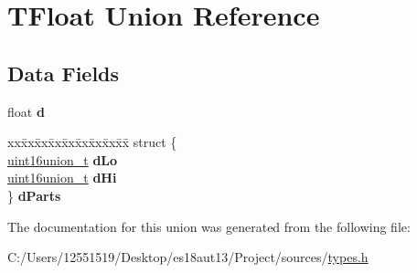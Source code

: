 \hypertarget{union_t_float}{}\section{T\+Float Union Reference}
\label{union_t_float}
\subsection*{Data Fields}
\begin{DoxyCompactItemize}
\item 
\hypertarget{union_t_float_a5261069e995f7e1b2b3b7580c954996b}{}float {\bfseries d}\label{union_t_float_a5261069e995f7e1b2b3b7580c954996b}

\item 
\hypertarget{union_t_float_ae1eaef4719ce541fef065e6ccded1a4b}{}\begin{tabbing}
xx\=xx\=xx\=xx\=xx\=xx\=xx\=xx\=xx\=\kill
struct \{\\
\>\hyperlink{unionuint16union__t}{uint16union\_t} {\bfseries dLo}\\
\>\hyperlink{unionuint16union__t}{uint16union\_t} {\bfseries dHi}\\
\} {\bfseries dParts}\label{union_t_float_ae1eaef4719ce541fef065e6ccded1a4b}
\\

\end{tabbing}\end{DoxyCompactItemize}


The documentation for this union was generated from the following file\+:\begin{DoxyCompactItemize}
\item 
C\+:/\+Users/12551519/\+Desktop/es18aut13/\+Project/sources/\hyperlink{types_8h}{types.\+h}\end{DoxyCompactItemize}
